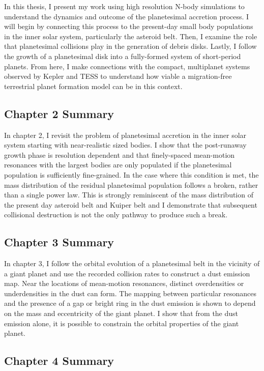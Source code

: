 In this thesis, I present my work using high resolution N-body simulations to understand the dynamics and outcome of the planetesimal accretion process. I will begin by connecting this process to the present-day small body populations in the inner solar system, particularly the asteroid belt. Then, I examine the role that planetesimal collisions play in the generation of debris disks. Lastly, I follow the growth of a planetesimal disk into a fully-formed system of short-period planets. From here, I make connections with the compact, multiplanet systems observed by Kepler and TESS to understand how viable a migration-free terrestrial planet formation model can be in this context.

\subsection{Chapter 2 Summary}

In chapter 2, I revisit the problem of planetesimal accretion in the inner solar system starting with near-realistic sized bodies. I show that the post-runaway growth phase is resolution dependent and that finely-spaced mean-motion resonances with the largest bodies are only populated if the planetesimal population is sufficiently fine-grained. In the case where this condition is met, the mass distribution of the residual planetesimal population follows a broken, rather than a single power law. This is strongly reminiscent of the mass distribution of the present day asteroid belt and Kuiper belt and I demonstrate that subsequent collisional destruction is not the only pathway to produce such a break.

\subsection{Chapter 3 Summary}

In chapter 3, I follow the orbital evolution of a planetesimal belt in the vicinity of a giant planet and use the recorded collision rates to construct a dust emission map. Near the locations of mean-motion resonances, distinct overdensities or underdensities in the dust can form. The mapping between particular resonances and the presence of a gap or bright ring in the dust emission is shown to depend on the mass and eccentricity of the giant planet. I show that from the dust emission alone, it is possible to constrain the orbital properties of the giant planet.

\subsection{Chapter 4 Summary}

